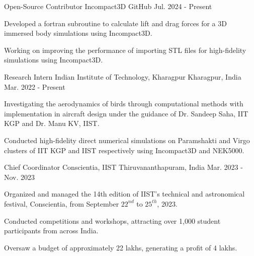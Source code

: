 

\begin{cventries}
  \cventry
  {Open-Source Contributor} %
  {Incompact3D} %
  {GitHub} %
  {Jul. 2024 - Present} %
  {
    \begin{cvitems} %
      \item {Developed a fortran subroutine to calculate lift and drag forces for a 3D immersed body simulations using Incompact3D.}
      \item {Working on improving the performance of importing STL files for high-fidelity simulations using Incompact3D.}
    \end{cvitems}
  }

  \cventry
  {Research Intern} %
  {Indian Institute of Technology, Kharagpur} %
  {Kharagpur, India} %
  {Mar. 2022 - Present} %
  {
    \begin{cvitems} %
      \item {Investigating the aerodynamics of birds through computational methods with implementation in aircraft design under the guidance of Dr. Sandeep Saha, IIT KGP and Dr. Manu KV, IIST.}
      \item {Conducted high-fidelity direct numerical simulations on Paramshakti and Virgo clusters of IIT KGP and IIST respectively using Incompact3D and NEK5000.}
    \end{cvitems}
  }

  \cventry
  {Chief Coordinator} %
  {Conscientia, IIST} %
  {Thiruvananthapuram, India} %
  {Mar. 2023 - Nov. 2023} %
  {
    \begin{cvitems} %
      \item {Organized and managed the 14th edition of IIST's technical and astronomical festival, Conscientia, from September $22^{nd}$ to $25^{th}$, 2023.}
      \item {Conducted competitions and workshops, attracting over 1,000 student participants from across India.}
      \item {Oversaw a budget of approximately 22 lakhs, generating a profit of 4 lakhs.}
    \end{cvitems}
  }


\end{cventries}
